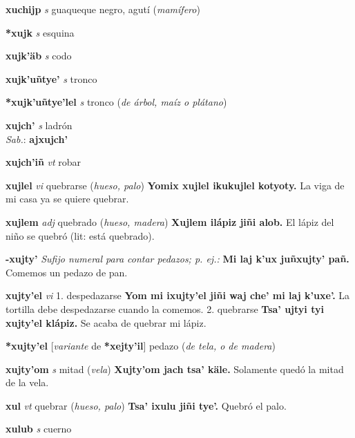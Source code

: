\documentclass[10pt]{scrbook}
\newcommand{\entry}[1]{\textbf{#1}}
\newcommand{\onedefinition}[1]{#1.}
\newcommand{\nontranslationdef}[1]{\textit{#1}}
\newcommand{\partofspeech}[1]{\textit{#1}}
\newcommand{\spanishtranslation}[1]{#1}
\newcommand{\clarification}[1]{(\textit{#1})}
\newcommand{\cholexample}[1]{\textbf{#1}}
\newcommand{\exampletranslation}[1]{#1}
\newcommand{\dialectvariant}[1]{\\\textit{#1}:}
\newcommand{\dialectword}[1]{\textbf{#1}}
\newcommand{\conjugationtense}[1]{[\textit{#1}}
\newcommand{\conjugationverb}[1]{de \textbf{#1}]}
\begin{document}
\begin{multicols}{2}
\entry{xuchijp}
\partofspeech{s}
\spanishtranslation{guaqueque negro, agutí}
\clarification{mamífero}

\entry{*xujk}
\partofspeech{s}
\spanishtranslation{esquina}

\entry{xujk'äb}
\partofspeech{s}
\spanishtranslation{codo}

\entry{xujk'uñtye'}
\partofspeech{s}
\spanishtranslation{tronco}

\entry{*xujk'uñtye'lel}
\partofspeech{s}
\spanishtranslation{tronco}
\clarification{de árbol, maíz o plátano}

\entry{xujch'}
\partofspeech{s}
\spanishtranslation{ladrón}
\dialectvariant{Sab.}
\dialectword{ajxujch'}

\entry{xujch'iñ}
\partofspeech{vt}
\spanishtranslation{robar}

\entry{xujlel}
\partofspeech{vi}
\spanishtranslation{quebrarse}
\clarification{hueso, palo}
\cholexample{Yomix xujlel ikukujlel kotyoty.}
\exampletranslation{La viga de mi casa ya se quiere quebrar.}

\entry{xujlem}
\partofspeech{adj}
\spanishtranslation{quebrado}
\clarification{hueso, madera}
\cholexample{Xujlem ilápiz jiñi alob.}
\exampletranslation{El lápiz del niño se quebró (lit: está quebrado).}

\entry{-xujty'}
\nontranslationdef{Sufijo numeral para contar pedazos; p. ej.:}
\cholexample{Mi laj k'ux juñxujty' pañ.}
\exampletranslation{Comemos un pedazo de pan.}

\entry{xujty'el}
\partofspeech{vi}
\onedefinition{1}
\spanishtranslation{despedazarse}
\cholexample{Yom mi ixujty'el jiñi waj che' mi laj k'uxe'.}
\exampletranslation{La tortilla debe despedazarse cuando la comemos.}
\onedefinition{2}
\spanishtranslation{quebrarse}
\cholexample{Tsa' ujtyi tyi xujty'el klápiz.}
\exampletranslation{Se acaba de quebrar mi lápiz.}

\entry{*xujty'el}
\conjugationtense{variante}
\conjugationverb{*xejty'il}
\spanishtranslation{pedazo}
\clarification{de tela, o de madera}

\entry{xujty'om}
\partofspeech{s}
\spanishtranslation{mitad}
\clarification{vela}
\cholexample{Xujty'om jach tsa' käle.}
\exampletranslation{Solamente quedó la mitad de la vela.}

\entry{xul}
\partofspeech{vt}
\spanishtranslation{quebrar}
\clarification{hueso, palo}
\cholexample{Tsa' ixulu jiñi tye'.}
\exampletranslation{Quebró el palo.}

\entry{xulub}
\partofspeech{s}
\spanishtranslation{cuerno}


\end{multicols}
\end{document}
